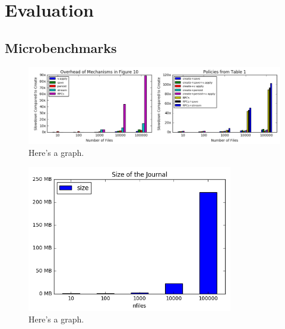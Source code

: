 \section{Evaluation}
\label{sec:evaluation}

\subsection{Microbenchmarks}
\begin{figure}[tb]
\centering
\includegraphics[width=180mm]{figures/results-microbenchmark.png}
\caption{Here's a graph.}
\end{figure}

\begin{figure}[tb]
\centering
\includegraphics[width=90mm]{figures/results-files.png}
\caption{Here's a graph.}
\end{figure}


